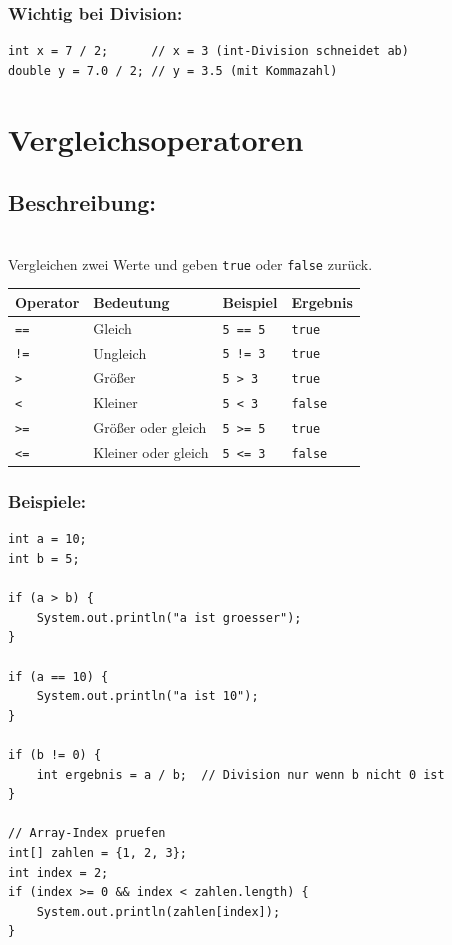 \subsubsection*{Wichtig bei Division:}
\begin{lstlisting}
int x = 7 / 2;      // x = 3 (int-Division schneidet ab)
double y = 7.0 / 2; // y = 3.5 (mit Kommazahl)
\end{lstlisting}

\newpage


\section*{Vergleichsoperatoren}

\subsection*{Beschreibung:}\\
Vergleichen zwei Werte und geben \texttt{true} oder \texttt{false} zurück.

\begin{center}
	\begin{tabular}{|l|l|l|l|}
		\hline
		\textbf{Operator} & \textbf{Bedeutung} & \textbf{Beispiel} & \textbf{Ergebnis} \\
		\hline
		\texttt{==} & Gleich & \texttt{5 == 5} & \texttt{true} \\
		\hline
		\texttt{!=} & Ungleich & \texttt{5 != 3} & \texttt{true} \\
		\hline
		\texttt{>} & Größer & \texttt{5 > 3} & \texttt{true} \\
		\hline
		\texttt{<} & Kleiner & \texttt{5 < 3} & \texttt{false} \\
		\hline
		\texttt{>=} & Größer oder gleich & \texttt{5 >= 5} & \texttt{true} \\
		\hline
		\texttt{<=} & Kleiner oder gleich & \texttt{5 <= 3} & \texttt{false} \\
		\hline
	\end{tabular}
\end{center}

\subsubsection*{Beispiele:}
\begin{lstlisting}
int a = 10;
int b = 5;

if (a > b) {
    System.out.println("a ist groesser");
}

if (a == 10) {
    System.out.println("a ist 10");
}

if (b != 0) {
    int ergebnis = a / b;  // Division nur wenn b nicht 0 ist
}

// Array-Index pruefen
int[] zahlen = {1, 2, 3};
int index = 2;
if (index >= 0 && index < zahlen.length) {
    System.out.println(zahlen[index]);
}
\end{lstlisting}

